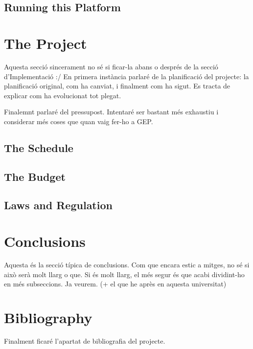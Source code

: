 \documentclass[a4paper,12pt]{article}
\begin{document}
\subsection{Running this Platform}

\section{The Project}

Aquesta secció sincerament no sé si ficar-la abans o després de la secció
d'Implementació :/ En primera instància parlaré de la planificació del
projecte: la planificació original, com ha canviat, i finalment com ha sigut.
Es tracta de explicar com ha evolucionat tot plegat.

Finalemnt parlaré del pressupost. Intentaré ser bastant més exhaustiu i
considerar més coses que quan vaig fer-ho a GEP.

\subsection{The Schedule}
\subsection{The Budget}
\subsection{Laws and Regulation}

\section{Conclusions}

Aquesta és la secció típica de conclusions. Com que encara estic a mitges, no
sé si això serà molt llarg o que. Si és molt llarg, el més segur és que acabi
dividint-ho en més subseccions. Ja veurem. (+ el que he après en aquesta
universitat)

\section{Bibliography}

Finalment ficaré l'apartat de bibliografia del projecte.
\end{document}
